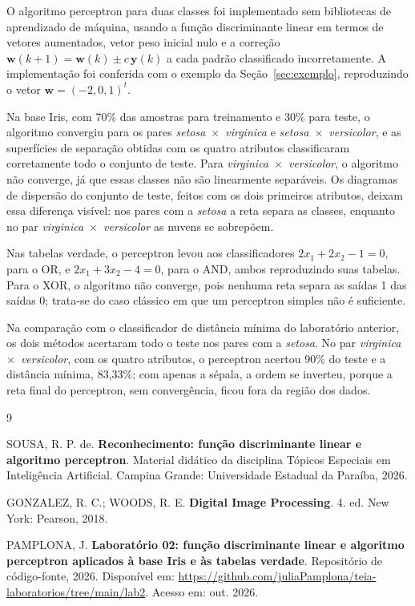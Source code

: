\documentclass[12pt,a4paper]{article}
\newcommand{\repositorio}{\url{https://github.com/juliaPamplona/teia-laboratorios/tree/main/lab2}}
\begin{document}
O algoritmo perceptron para duas classes foi implementado sem bibliotecas de aprendizado de máquina, usando a função discriminante linear em termos de vetores aumentados, vetor peso inicial nulo e a correção $\mathbf{w}(k+1) = \mathbf{w}(k) \pm c\,\mathbf{y}(k)$ a cada padrão classificado incorretamente. A implementação foi conferida com o exemplo da Seção~\ref{sec:exemplo}, reproduzindo o vetor $\mathbf{w} = (-2, 0, 1)^t$.

Na base Iris, com 70\% das amostras para treinamento e 30\% para teste, o algoritmo convergiu para os pares \emph{setosa}~$\times$~\emph{virginica} e \emph{setosa}~$\times$~\emph{versicolor}, e as superfícies de separação obtidas com os quatro atributos classificaram corretamente todo o conjunto de teste. Para \emph{virginica}~$\times$~\emph{versicolor}, o algoritmo não converge, já que essas classes não são linearmente separáveis. Os diagramas de dispersão do conjunto de teste, feitos com os dois primeiros atributos, deixam essa diferença visível: nos pares com a \emph{setosa} a reta separa as classes, enquanto no par \emph{virginica}~$\times$~\emph{versicolor} as nuvens se sobrepõem.

Nas tabelas verdade, o perceptron levou aos classificadores $2x_1 + 2x_2 - 1 = 0$, para o OR, e $2x_1 + 3x_2 - 4 = 0$, para o AND, ambos reproduzindo suas tabelas. Para o XOR, o algoritmo não converge, pois nenhuma reta separa as saídas 1 das saídas 0; trata-se do caso clássico em que um perceptron simples não é suficiente.

Na comparação com o classificador de distância mínima do laboratório anterior, os dois métodos acertaram todo o teste nos pares com a \emph{setosa}. No par \emph{virginica}~$\times$~\emph{versicolor}, com os quatro atributos, o perceptron acertou 90\% do teste e a distância mínima, 83,33\%; com apenas a sépala, a ordem se inverteu, porque a reta final do perceptron, sem convergência, ficou fora da região dos dados.

\begin{thebibliography}{9}

SOUSA, R. P. de. \textbf{Reconhecimento: função discriminante linear e algoritmo perceptron}. Material didático da disciplina Tópicos Especiais em Inteligência Artificial. Campina Grande: Universidade Estadual da Paraíba, 2026.

GONZALEZ, R. C.; WOODS, R. E. \textbf{Digital Image Processing}. 4. ed. New York: Pearson, 2018.

PAMPLONA, J. \textbf{Laboratório 02: função discriminante linear e algoritmo perceptron aplicados à base Iris e às tabelas verdade}. Repositório de código-fonte, 2026. Disponível em: \repositorio. Acesso em: out. 2026.

\end{thebibliography}
\end{document}
